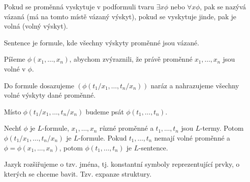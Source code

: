 \documentclass[12pt]{article}                   %
\begin{document}
        \begin{definice}
            Pokud se proměnná vyskytuje v podformuli tvaru $\exists x \phi$ nebo $\forall x \phi$, pak se nazývá vázaná (má na tomto místě vázaný výskyt), pokud se vyskytuje jinde, pak je volná (volný výskyt).
        \end{definice}

        \begin{definice}[Sentence (= uzavřená formule)]
            Sentence je formule, kde všechny výskyty proměnné jsou vázané.
        \end{definice}

        \begin{poznamka}
            Píšeme $\phi(x_1, …, x_n)$, abychom zvýraznili, že právě proměnné $x_1, …, x_n$ jsou volné v $\phi$.

            Do formule dosazujeme $(\phi(t_1/x_1, …, t_n/x_n))$ naráz a nahrazujeme všechny volné výskyty dané proměnné.

            Místo $\phi(t_1/x_1, …, t_n/x_n)$ budeme psát $\phi(t_1, …, t_n)$.
        \end{poznamka}

        \begin{lemma}
            Nechť $\phi$ je $L$-formule, $x_1, …, x_n$ různé proměnné a $t_1, …, t_n$ jsou $L$-termy. Potom $\phi(t_1/x_1, …, t_n/x_n)$ je $L$-formule. Pokud $t_1, …, t_n$ nemají volné proměnné a $\phi = \phi(x_1, …, x_n)$, potom $\phi(t_1, …, t_n)$ je $L$-sentence.
        \end{lemma}

        \begin{definice}
            Jazyk rozšiřujeme o tzv. jména, tj. konstantní symboly reprezentující prvky, o kterých se chceme bavit. Tzv. expanze struktury.
        \end{definice}
\end{document}
